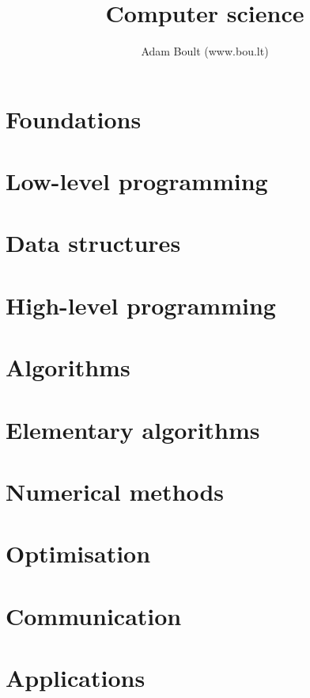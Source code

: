 \documentclass[oneside]{book}
\begin{document}
\author{Adam Boult (www.bou.lt)}
\title{Computer science}
\maketitle

\setcounter{tocdepth}{1}
\tableofcontents



\part{Foundations}





\part{Low-level programming}


\part{Data structures}







\part{High-level programming}




\part{Algorithms}




\part{Elementary algorithms}



\part{Numerical methods}





\part{Optimisation}



\part{Communication}





\part{Applications}


\end{document}
